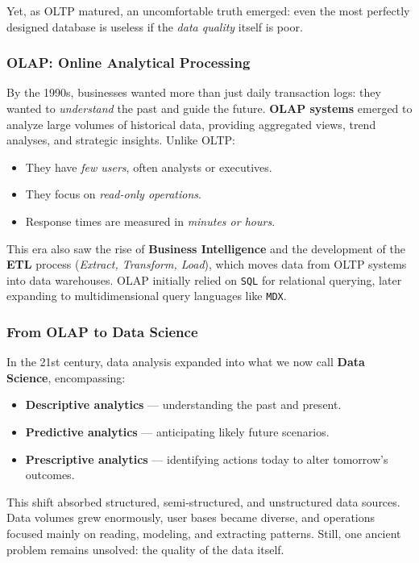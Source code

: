 \documentclass[12pt,a4paper]{article}
\begin{document}
Yet, as OLTP matured, an uncomfortable truth emerged: even the most perfectly designed database is useless if the \emph{data quality} itself is poor.

\subsubsection{OLAP: Online Analytical Processing}
By the 1990s, businesses wanted more than just daily transaction logs: they wanted to \emph{understand} the past and guide the future.  
\textbf{OLAP systems} emerged to analyze large volumes of historical data, providing aggregated views, trend analyses, and strategic insights.  
Unlike OLTP:
\begin{itemize}
    \item They have \emph{few users}, often analysts or executives.
    \item They focus on \emph{read-only operations}.
    \item Response times are measured in \emph{minutes or hours}.
\end{itemize}
This era also saw the rise of \textbf{Business Intelligence} and the development of the \textbf{ETL} process (\emph{Extract, Transform, Load}), which moves data from OLTP systems into data warehouses.  
OLAP initially relied on \texttt{SQL} for relational querying, later expanding to multidimensional query languages like \texttt{MDX}.

\subsubsection{From OLAP to Data Science}
In the 21st century, data analysis expanded into what we now call \textbf{Data Science}, encompassing:
\begin{itemize}
    \item \textbf{Descriptive analytics} --- understanding the past and present.
    \item \textbf{Predictive analytics} --- anticipating likely future scenarios.
    \item \textbf{Prescriptive analytics} --- identifying actions today to alter tomorrow’s outcomes.
\end{itemize}
This shift absorbed structured, semi-structured, and unstructured data sources.  
Data volumes grew enormously, user bases became diverse, and operations focused mainly on reading, modeling, and extracting patterns.  
Still, one ancient problem remains unsolved: the quality of the data itself.
\end{document}
